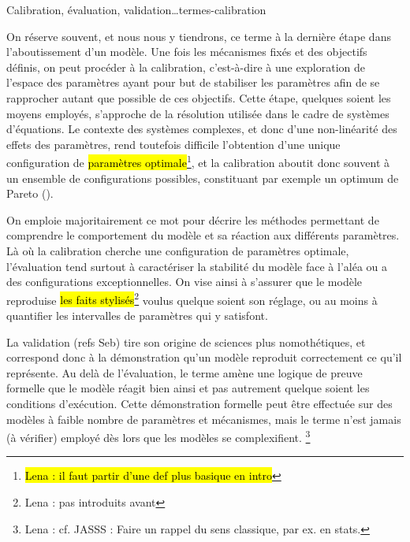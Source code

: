 \begin{encadre}{Calibration, évaluation, validation\ldots}{termes-calibration}
	\begin{description}[style=nextline]	
		\item[Calibration] On réserve souvent, et nous nous y tiendrons, ce terme à la dernière étape dans l'aboutissement d'un modèle.
		Une fois les mécanismes fixés et des objectifs définis, on peut procéder à la calibration, c'est-à-dire à une exploration de l'espace des paramètres ayant pour but de stabiliser les paramètres afin de se rapprocher autant que possible de ces objectifs.
		Cette étape, quelques soient les moyens employés, s'approche de la résolution utilisée dans le cadre de systèmes d'équations.
		Le contexte des systèmes complexes, et donc d'une non-linéarité des effets des paramètres, rend toutefois difficile l'obtention d'une unique configuration de \hl{paramètres optimale}\footnote{
			\hl{Lena : il faut partir d'une def plus basique en intro}
		}, et la calibration aboutit donc souvent à un ensemble de configurations possibles, constituant par exemple un optimum de Pareto ().
		
		\item[Évaluation] On emploie majoritairement ce mot pour décrire les méthodes permettant de comprendre le comportement du modèle et sa réaction aux différents paramètres.
		Là où la calibration cherche une configuration de paramètres optimale, l'évaluation tend surtout à caractériser la stabilité du modèle face à l'aléa ou a des configurations exceptionnelles.
		On vise ainsi à s'assurer que le modèle reproduise \hl{les faits stylisés}\footnote{Lena : pas introduits avant} voulus quelque soient son réglage, ou au moins à quantifier les intervalles de paramètres qui y satisfont.
		
		\item[Validation] La validation (refs Seb) tire son origine de sciences plus nomothétiques, et correspond donc à la démonstration qu'un modèle reproduit correctement ce qu'il représente.
		Au delà de l'évaluation, le terme amène une logique de preuve formelle que le modèle réagit bien ainsi et pas autrement quelque soient les conditions d'exécution.
		Cette démonstration formelle peut être effectuée sur des modèles à faible nombre de paramètres et mécanismes, mais le terme n'est jamais (à vérifier) employé dès lors que les modèles se complexifient.
		\footnote{
			Lena : cf. JASSS : Faire un rappel du sens classique, par ex. en stats.
		}
	\end{description}
\end{encadre}

